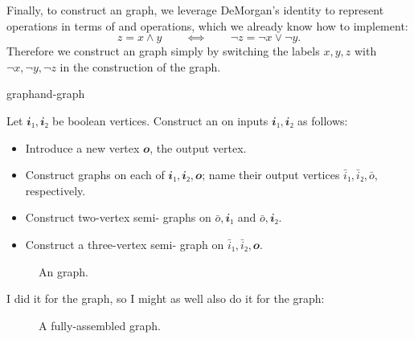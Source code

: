 Finally, to construct an \AND{} graph, we leverage DeMorgan's identity to
represent \AND{} operations in terms of \NOT{} and \OR{} operations, which we
already know how to implement:
\[
  z=x∧y \qquad⟺\qquad ¬z=¬x∨¬y.
\]
Therefore we construct an \AND{} graph simply by switching the labels \(x,y,z\)
with \(¬x,¬y,¬z\) in the construction of the \OR{} graph.

\begin{definition}{\AND{} graph}{and-graph}

  Let \(𝒊₁,𝒊₂\) be boolean vertices.  Construct an  on inputs
  \(𝒊₁,𝒊₂\) as follows:
  \begin{itemize}[nosep]
    \item Introduce a new vertex \(𝒐\), the output vertex.
    \item Construct \NOT{} graphs on each of \(𝒊₁,𝒊₂,𝒐\); name their output
      vertices \(\bar i₁,\bar i₂,\bar o\), respectively.
    \item Construct two-vertex semi-\OR{} graphs on \(\bar o,𝒊₁\) and \(\bar
      o,𝒊₂\).
    \item Construct a three-vertex semi-\OR{} graph on \(\bar i₁,\bar i₂,𝒐\).
  \end{itemize}

  \begin{figure}[H]
  \begin{center}
    \caption{An \AND{} graph.}
  \end{center}
\end{figure}

  \begin{aside}
    I did it for the \OR{} graph, so I might as well also do it for the \AND{} graph:
    \begin{figure}[H]
    \begin{center}
      \caption{A fully-assembled \AND{} graph.}
    \end{center}
  \end{figure}
  \end{aside}

\end{definition}

